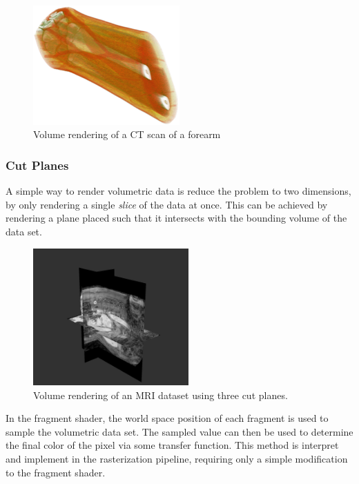 \documentclass{article}
\begin{document}
\begin{figure}[tbh]
    \centering
    \includegraphics[width=0.5\textwidth]{images/VolumeRendering.png}
    \caption{Volume rendering of a CT scan of a forearm}
    \label{fig:forearmCT}
\end{figure}

\subsubsection{Cut Planes}
A simple way to render volumetric data is reduce the problem to two dimensions, by only rendering a single \textit{slice} of the data
at once. This can be achieved by rendering a plane placed such that it intersects with the bounding volume of the 
data set. 
\begin{figure}[tbh!]
    \centering
    \includegraphics[width=0.53\textwidth]{images/CutPlanes.png}
    \caption{Volume rendering of an MRI dataset using three cut planes.}
    \label{fig:cutPlanes}
\end{figure}
In the fragment shader, the world space position of each fragment is used to sample the volumetric data set. The sampled value can then be used to determine the final color of the pixel via some transfer function.
This method is interpret and implement in the rasterization pipeline, requiring only a simple modification to the fragment shader. 
\end{document}
